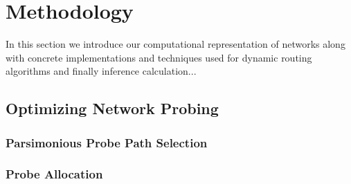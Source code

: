 \chapter{Methodology}
\label{cha:methodology}
In this section we introduce our computational representation of networks along with concrete implementations and techniques used for dynamic routing algorithms and finally inference calculation...

\section{Optimizing Network Probing}
\label{sec:Moptprobing}
\subsection{Parsimonious Probe Path Selection}
\label{ssec:Mpppselection}

\subsection{Probe Allocation}
\label{ssec:Mpallocation}

